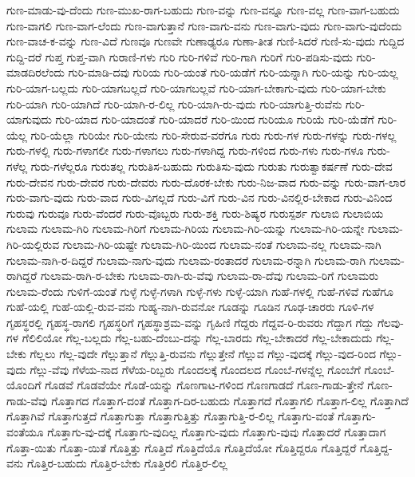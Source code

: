 {ಗುಣ-ಮಾಡು-ವು-ದೆಂದು
ಗುಣ-ಮುಖ-ರಾಗ-ಬಹುದು
ಗುಣ-ವನ್ನು
ಗುಣ-ವನ್ನೂ
ಗುಣ-ವಲ್ಲ
ಗುಣ-ವಾಗ-ಬಹುದು
ಗುಣ-ವಾಗಲಿ
ಗುಣ-ವಾಗ-ಲೆಂದು
ಗುಣ-ವಾಗುತ್ತಾನೆ
ಗುಣ-ವಾಗು-ವನು
ಗುಣ-ವಾಗು-ವುದು
ಗುಣ-ವಾಗು-ವುದೆಂದು
ಗುಣ-ವಾಚ-ಕ-ವನ್ನು
ಗುಣ-ವಿದೆ
ಗುಣವೂ
ಗುಣವೇ
ಗುಣಾಢ್ಯರೂ
ಗುಣಾ-ತೀತ
ಗುಣಿ-ಸಿದರೆ
ಗುಣಿ-ಸು-ವುದು
ಗುದ್ದಿದ
ಗುದ್ದಿ-ದರೆ
ಗುಪ್ತ
ಗುಪ್ತ-ವಾಗಿ
ಗುರಾಣಿ-ಗಳು
ಗುರಿ
ಗುರಿ-ಗಳಿವೆ
ಗುರಿ-ಗಾಗಿ
ಗುರಿಗೆ
ಗುರಿ-ಪಡಿಸು-ವುದು
ಗುರಿ-ಮಾಡದಿರಲೆಂದು
ಗುರಿ-ಮಾಡಿ-ದವು
ಗುರಿಯ
ಗುರಿ-ಯಂತೆ
ಗುರಿ-ಯಡೆಗೆ
ಗುರಿ-ಯನ್ನಾಗಿ
ಗುರಿ-ಯನ್ನು
ಗುರಿ-ಯಲ್ಲ
ಗುರಿ-ಯಾಗ-ಬಲ್ಲದು
ಗುರಿ-ಯಾಗಬಲ್ಲದೆ
ಗುರಿ-ಯಾಗಬಲ್ಲವೆ
ಗುರಿ-ಯಾಗ-ಬೇಕಾಗು-ವುದು
ಗುರಿ-ಯಾಗ-ಬೇಕು
ಗುರಿ-ಯಾಗಿ
ಗುರಿ-ಯಾಗಿದೆ
ಗುರಿ-ಯಾಗಿ-ರ-ಲಿಲ್ಲ
ಗುರಿ-ಯಾಗಿ-ರು-ವುದು
ಗುರಿ-ಯಾಗುತ್ತಿ-ರುವೆನು
ಗುರಿ-ಯಾಗುವುದು
ಗುರಿ-ಯಾದ
ಗುರಿ-ಯಾದಂತೆ
ಗುರಿ-ಯಾದರೆ
ಗುರಿ-ಯಿಂದ
ಗುರಿಯೂ
ಗುರಿಯೆ
ಗುರಿ-ಯೆಡೆಗೆ
ಗುರಿ-ಯೆಲ್ಲ
ಗುರಿ-ಯೆಲ್ಲಾ
ಗುರಿಯೇ
ಗುರಿ-ಯೇನು
ಗುರಿ-ಸೇರುವ-ವರೆಗೂ
ಗುರು
ಗುರು-ಗಳ
ಗುರು-ಗಳನ್ನು
ಗುರು-ಗಳಲ್ಲ
ಗುರು-ಗಳಲ್ಲಿ
ಗುರು-ಗಳಾಗಲೀ
ಗುರು-ಗಳಾಗಲು
ಗುರು-ಗಳಾಗಿದ್ದ
ಗುರು-ಗಳಿಂದ
ಗುರು-ಗಳು
ಗುರು-ಗಳೂ
ಗುರು-ಗಳೆಲ್ಲ
ಗುರು-ಗಳೆಲ್ಲರೂ
ಗುರುತಲ್ಲ
ಗುರುತಿಸ-ಬಹುದು
ಗುರುತಿಸು-ವುದು
ಗುರುತು
ಗುರುತ್ವಾಕರ್ಷಣೆ
ಗುರು-ದೇವ
ಗುರು-ದೇವನ
ಗುರು-ದೇವರ
ಗುರು-ದೇವರು
ಗುರು-ದೊರಕ-ಬೇಕು
ಗುರು-ನಿಜ-ವಾದ
ಗುರು-ವನ್ನು
ಗುರು-ವಾಗ-ಲಾರ
ಗುರು-ವಾಗು-ವುದು
ಗುರು-ವಾದ
ಗುರು-ವಿಗಲ್ಲದೆ
ಗುರು-ವಿಗೆ
ಗುರು-ವಿನ
ಗುರು-ವಿನಲ್ಲಿರ-ಬೇಕಾದ
ಗುರು-ವಿನಿಂದ
ಗುರುವು
ಗುರುವೂ
ಗುರು-ವೆಂದರೆ
ಗುರು-ವೊಬ್ಬರು
ಗುರು-ಶಕ್ತಿ
ಗುರು-ಶಿಷ್ಯರ
ಗುರುಸ್ಪರ್ಶ
ಗುಲಾಬಿ
ಗುಲಾಬಿಯ
ಗುಲಾಮ
ಗುಲಾಮ-ಗಿರಿ
ಗುಲಾಮ-ಗಿರಿಗೆ
ಗುಲಾಮ-ಗಿರಿಯ
ಗುಲಾಮ-ಗಿರಿ-ಯನ್ನು
ಗುಲಾಮ-ಗಿರಿ-ಯನ್ನೇ
ಗುಲಾಮ-ಗಿರಿ-ಯಲ್ಲಿರುವ
ಗುಲಾಮ-ಗಿರಿ-ಯಷ್ಟೇ
ಗುಲಾಮ-ಗಿರಿ-ಯಿಂದ
ಗುಲಾಮ-ನಂತೆ
ಗುಲಾಮ-ನಲ್ಲ
ಗುಲಾಮ-ನಾಗಿ
ಗುಲಾಮ-ನಾಗಿ-ರ-ದಿದ್ದರೆ
ಗುಲಾಮ-ನಾಗು-ವುದು
ಗುಲಾಮ-ರಂತಾದರೆ
ಗುಲಾಮ-ರನ್ನಾಗಿ
ಗುಲಾಮ-ರಾಗಿ
ಗುಲಾಮ-ರಾಗಿದ್ದರೆ
ಗುಲಾಮ-ರಾಗಿ-ರ-ಬೇಕು
ಗುಲಾಮ-ರಾಗಿ-ರು-ವೆವು
ಗುಲಾಮ-ರಾ-ದೆವು
ಗುಲಾಮ-ರಿಗೆ
ಗುಲಾಮರು
ಗುಲಾಮ-ರೆಂದು
ಗುಳಿಗೆ-ಯಂತೆ
ಗುಳ್ಳೆ
ಗುಳ್ಳೆ-ಗಳಾಗಿ
ಗುಳ್ಳೆ-ಗಳು
ಗುಳ್ಳೆ-ಯಾಗಿ
ಗುಹೆ-ಗಳಲ್ಲಿ
ಗುಹೆ-ಗಳಿವೆ
ಗುಹೆಗೂ
ಗುಹೆ-ಯಲ್ಲಿ
ಗುಹೆ-ಯಲ್ಲಿ-ರುವ-ವನು
ಗುಹ್ಯ-ನಾಗಿ-ರುವನೋ
ಗೂಡನ್ನು
ಗೂಡಿನ
ಗೂಢ-ಚಾರರು
ಗೂಳಿ-ಗಳ
ಗೃಹಸ್ಥರಲ್ಲಿ
ಗೃಹಸ್ಥ-ರಾಗಲಿ
ಗೃಹಸ್ಥರಿಗೆ
ಗೃಹಸ್ಥಾಶ್ರಮ-ವನ್ನು
ಗೃಹಿಣಿ
ಗೆದ್ದರು
ಗೆದ್ದವ-ರಿ-ರುವರು
ಗೆದ್ದಾಗ
ಗೆದ್ದು
ಗೆಲವು-ಗಳ
ಗೆಲಿಲಿಯೋ
ಗೆಲ್ಲ-ಬಲ್ಲದು
ಗೆಲ್ಲ-ಬಹು-ದೆಂಬು-ದನ್ನು
ಗೆಲ್ಲ-ಬಾರದು
ಗೆಲ್ಲ-ಬೇಕಾದರೆ
ಗೆಲ್ಲ-ಬೇಕಾದುದು
ಗೆಲ್ಲ-ಬೇಕು
ಗೆಲ್ಲಲು
ಗೆಲ್ಲ-ವುದೇ
ಗೆಲ್ಲುತ್ತಾನೆ
ಗೆಲ್ಲುತ್ತಿ-ರುವನು
ಗೆಲ್ಲುತ್ತೇನೆ
ಗೆಲ್ಲುವ
ಗೆಲ್ಲು-ವುದಕ್ಕೆ
ಗೆಲ್ಲು-ವುದ-ರಿಂದ
ಗೆಲ್ಲು-ವುದು
ಗೆಲ್ಲು-ವೆವು
ಗೆಳೆಯ-ನಾದ
ಗೆಳೆಯ-ರಿಬ್ಬರು
ಗೊಂದಲಕ್ಕೆ
ಗೊಂದಲದ
ಗೊಂಬೆ-ಗಳನ್ನೆಲ್ಲ
ಗೊಂಬೆಗೆ
ಗೊಂಬೆ-ಯೊಂದಿಗೆ
ಗೊಡವೆ
ಗೊಡವೆಯೇ
ಗೊಡೆ-ಯನ್ನು
ಗೊಣಗಾಟ-ಗಳಿಂದ
ಗೊಣಗಾಡದೆ
ಗೊಣ-ಗಾಡು-ತ್ತೇನೆ
ಗೊಣ-ಗಾಡು-ವೆವು
ಗೊತ್ತಾಗದ
ಗೊತ್ತಾಗ-ದಂತೆ
ಗೊತ್ತಾಗ-ದಿರ-ಬಹುದು
ಗೊತ್ತಾಗದೆ
ಗೊತ್ತಾಗಲಿ
ಗೊತ್ತಾಗ-ಲಿಲ್ಲ
ಗೊತ್ತಾಗಿದೆ
ಗೊತ್ತಾಗಿವೆ
ಗೊತ್ತಾಗುತ್ತದೆ
ಗೊತ್ತಾಗುತ್ತಾ
ಗೊತ್ತಾಗುತ್ತಿತ್ತು
ಗೊತ್ತಾಗುತ್ತಿ-ರ-ಲಿಲ್ಲ
ಗೊತ್ತಾಗು-ವಂತೆ
ಗೊತ್ತಾಗು-ವಂತೆಯೂ
ಗೊತ್ತಾಗು-ವು-ದಕ್ಕೆ
ಗೊತ್ತಾಗು-ವುದಿಲ್ಲ
ಗೊತ್ತಾಗು-ವುದು
ಗೊತ್ತಾಗು-ವುವು
ಗೊತ್ತಾದರೆ
ಗೊತ್ತಾದಾಗ
ಗೊತ್ತಾ-ಯಿತು
ಗೊತ್ತಾ-ಯಿತೆ
ಗೊತ್ತಿತ್ತು
ಗೊತ್ತಿದೆ
ಗೊತ್ತಿದೆಯೊ
ಗೊತ್ತಿದೆಯೋ
ಗೊತ್ತಿದ್ದರೂ
ಗೊತ್ತಿದ್ದರೆ
ಗೊತ್ತಿದ್ದ-ವನು
ಗೊತ್ತಿರ-ಬಹುದು
ಗೊತ್ತಿರ-ಬೇಕು
ಗೊತ್ತಿರಲಿ
ಗೊತ್ತಿರ-ಲಿಲ್ಲ
}
